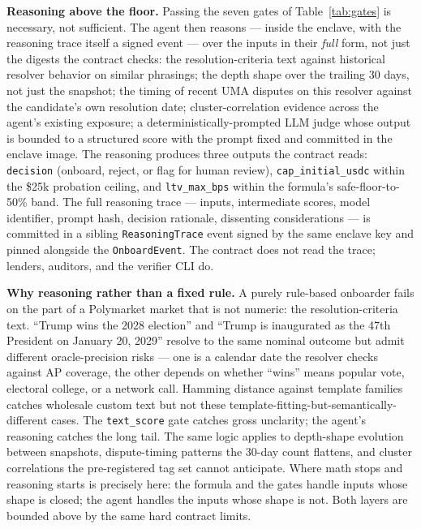 \documentclass[11pt,letterpaper]{article}
\begin{document}
\textbf{Reasoning above the floor.} Passing the seven gates of Table~\ref{tab:gates} is necessary, not sufficient. The agent then reasons --- inside the enclave, with the reasoning trace itself a signed event --- over the inputs in their \emph{full} form, not just the digests the contract checks: the resolution-criteria text against historical resolver behavior on similar phrasings; the depth shape over the trailing 30 days, not just the snapshot; the timing of recent UMA disputes on this resolver against the candidate's own resolution date; cluster-correlation evidence across the agent's existing exposure; a deterministically-prompted LLM judge whose output is bounded to a structured score with the prompt fixed and committed in the enclave image. The reasoning produces three outputs the contract reads: \texttt{decision} (onboard, reject, or flag for human review), \texttt{cap\_initial\_usdc} within the \$25k probation ceiling, and \texttt{ltv\_max\_bps} within the formula's safe-floor-to-50\% band. The full reasoning trace --- inputs, intermediate scores, model identifier, prompt hash, decision rationale, dissenting considerations --- is committed in a sibling \texttt{ReasoningTrace} event signed by the same enclave key and pinned alongside the \texttt{OnboardEvent}. The contract does not read the trace; lenders, auditors, and the verifier CLI do.

\textbf{Why reasoning rather than a fixed rule.} A purely rule-based onboarder fails on the part of a Polymarket market that is not numeric: the resolution-criteria text. ``Trump wins the 2028 election'' and ``Trump is inaugurated as the 47th President on January 20, 2029'' resolve to the same nominal outcome but admit different oracle-precision risks --- one is a calendar date the resolver checks against AP coverage, the other depends on whether ``wins'' means popular vote, electoral college, or a network call. Hamming distance against template families catches wholesale custom text but not these template-fitting-but-semantically-different cases. The \texttt{text\_score} gate catches gross unclarity; the agent's reasoning catches the long tail. The same logic applies to depth-shape evolution between snapshots, dispute-timing patterns the 30-day count flattens, and cluster correlations the pre-registered tag set cannot anticipate. Where math stops and reasoning starts is precisely here: the formula and the gates handle inputs whose shape is closed; the agent handles the inputs whose shape is not. Both layers are bounded above by the same hard contract limits.
\end{document}

